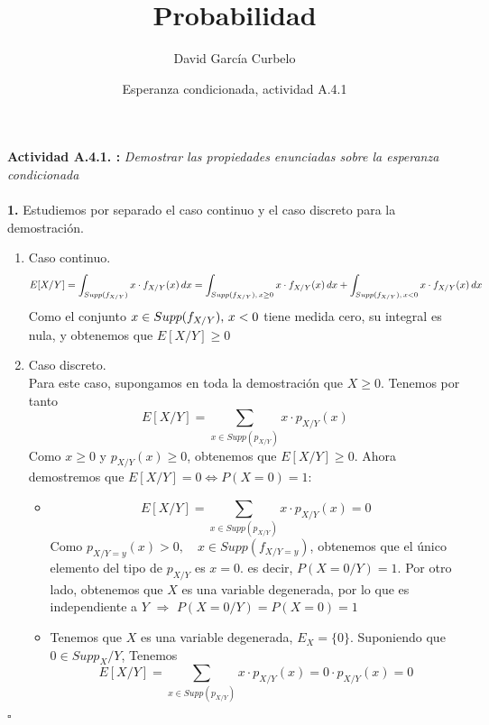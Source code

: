 \documentclass[fleqn]{article}
\author{David García Curbelo}
\title{Probabilidad}
\date{Esperanza condicionada, actividad A.4.1}
\newcommand*{\QED}{\hfill\ensuremath{\square}}
\begin{document}
    \maketitle
    \setcounter{page}{1}
    \pagestyle{plain}
    
    \textbf{Actividad A.4.1. : } \textit{Demostrar las propiedades enunciadas sobre la esperanza condicionada }\\ \\

    \textbf{1. } Estudiemos por separado el caso continuo y el caso discreto para la demostración.
    
    \begin{enumerate}
        \item Caso continuo. \\
                $$E[X/Y] = \int_{Supp(f_{X/Y})} x\cdot f_{X/Y}(x) \thinspace dx = \int_{Supp(f_{X/Y}), \thinspace x\geq 0} x\cdot f_{X/Y}(x) \thinspace dx + 
                \int_{Supp(f_{X/Y}), \thinspace x<0} x\cdot f_{X/Y}(x) \thinspace dx$$
                Como el conjunto $x\in Supp(f_{X/Y}), \thinspace x<0$ tiene medida cero, su integral es nula, y obtenemos que $E[X/Y] \geq 0$
        \item Caso discreto. \\
                Para  este caso, supongamos en toda la demostración que $X \geq 0$. Tenemos por tanto 
                $$E[X/Y] = \sum_{x\in Supp(p_{X/Y})} x\cdot p_{X/Y}(x)$$ 
                Como $x\geq 0$ y $p_{X/Y}(x) \geq 0$, obtenemos que $E[X/Y] \geq 0$. Ahora demostremos que $E[X/Y] = 0 \Leftrightarrow P(X=0) = 1$:
                \begin{itemize}
                    \item[\fbox{$\Rightarrow$}] $$E[X/Y] = \sum_{x\in Supp(p_{X/Y})} x\cdot p_{X/Y}(x) = 0$$ 
                            Como $p_{X/Y=y}(x) > 0, \quad x\in Supp(f_{X/Y=y})$, obtenemos que el único elemento del tipo de $p_{X/Y}$ es $x=0$. es decir, $P(X=0/Y)=1$.
                            Por otro lado, obtenemos que $X$ es una variable degenerada, por lo que es independiente a $Y$ $\Rightarrow$ $P(X=0/Y)=P(X=0)=1$
                    \item[\fbox{$\Leftarrow$}] Tenemos que $X$ es una variable degenerada, $E_X = \{0\}$. Suponiendo que $0 \in Supp_X/Y$, Tenemos
                            $$E[X/Y] = \sum_{x\in Supp(p_{X/Y})} x\cdot p_{X/Y}(x) = 0 \cdot p_{X/Y}(x) = 0$$ 
                \end{itemize}
    \end{enumerate}
    \QED \\ \\
\end{document}

